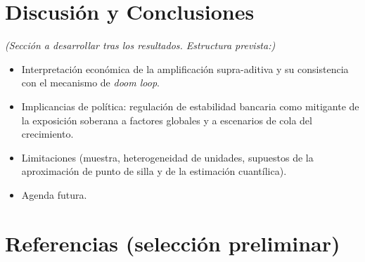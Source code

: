 \documentclass[5p,times,twocolumn,authoryear]{elsarticle}
\begin{document}

\section{Discusión y Conclusiones}

\textit{(Sección a desarrollar tras los resultados. Estructura prevista:)}

\begin{itemize}
    \item Interpretación económica de la amplificación supra-aditiva y su consistencia con el mecanismo de \textit{doom loop}.
    \item Implicancias de política: regulación de estabilidad bancaria como mitigante de la exposición soberana a factores globales y a escenarios de cola del crecimiento.
    \item Limitaciones (muestra, heterogeneidad de unidades, supuestos de la aproximación de punto de silla y de la estimación cuantílica).
    \item Agenda futura.
\end{itemize}


\section*{Referencias (selección preliminar)}
\end{document}
